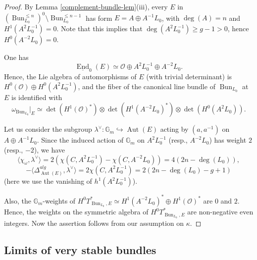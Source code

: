 \documentclass[12pt,reqno]{amsart}
\DeclareMathOperator\Z{\mathbb Z}
\theoremstyle{definition}
\theoremstyle{remark}
\numberwithin{equation}{section}
\newcommand{\De}{\Delta}
\newcommand{\Aut}{\operatorname{Aut}}
\newcommand{\und}{\underline}
\newcommand{\hra}{\hookrightarrow}
\newcommand{\ot}{\otimes}
\newcommand{\OO}{{\mathcal O}}
\newcommand{\om}{\omega}
\newcommand{\la}{\lambda}
\newcommand{\G}{{\mathbb G}}
\newcommand{\lan}{\langle}
\newcommand{\ran}{\rangle}
\newcommand{\Bun}{{\operatorname{Bun}}}
\newcommand{\End}{{\operatorname{End}}}
\begin{document}
\begin{proof}
By Lemma \ref{complement-bundle-lem}(iii), every $E$ in 
$(\Bun_{L_0}^{\le n})^0\setminus \Bun_{L_0}^{\le n-1}$ has form
$E=A\oplus A^{-1}L_0$, with $\deg(A)=n$ and $H^1(A^2L_0^{-1})=0$. 
Note that this implies that $\deg(A^2L_0^{-1})\ge g-1>0$, hence $H^0(A^{-2}L_0)=0$.

One has
$$\und{\End}_0(E)\simeq \OO\oplus A^2L_0^{-1}\oplus A^{-2}L_0.$$
Hence, the Lie algebra of automorphisms of $E$ (with trivial determinant) is $H^0(\OO)\oplus H^0(A^2L_0^{-1})$,
and the fiber of the canonical line bundle of $\Bun_{L_0}$ at $E$ is identified with 
$$\om_{\Bun_{L_0}}|_E\simeq \det(H^1(\OO)^*)\ot\det(H^1(A^{-2}L_0)^*)\ot \det(H^0(A^2L_0)).$$

Let us consider the subgroup $\la^\vee:\G_m\hra \Aut(E)$ acting by $(a,a^{-1})$ on $A\oplus A^{-1}L_0$.
Since the induced action of $\G_m$ on $A^2L_0^{-1}$ (resp., $A^{-2}L_0$) has weight $2$ (resp., $-2$), we have
$$\lan\chi_{\om},\la^\vee\ran=2(\chi(C,A^2L_0^{-1})-\chi(C,A^{-2}L_0))=4(2n-\deg(L_0)),$$
$$-\lan\De^{alg}_{\Aut(E)},\la^\vee\ran=2 \chi(C,A^2L_0^{-1})=2(2n-\deg(L_0)-g+1)$$
(here we use the vanishing of $h^1(A^2L_0^{-1})$).

Also, the $\G_m$-weights of $H^0T^*_{\Bun_{L_0},E}\simeq H^1(A^{-2}L_0)^*\oplus H^1(\OO)^*$ are $0$ and $2$.
Hence, the weights on the symmetric algebra of $H^0T^*_{\Bun_{L_0},E}$ are non-negative even integers.
Now the assertion follows from our assumption on $\kappa$.
\end{proof}

\subsection{Limits of very stable bundles}\label{vs-lim-sec}


\end{document}
